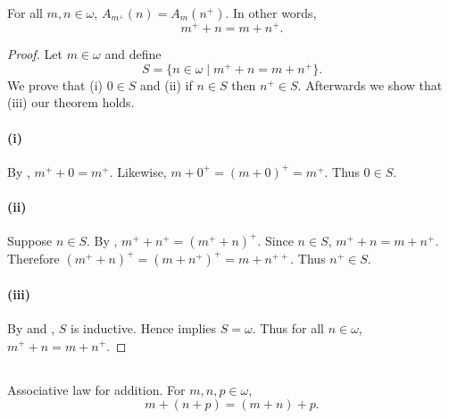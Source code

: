\documentclass{report}
\begin{document}
\begin{lemma}[3]

  For all $m, n \in \omega$, $A_{m^+}(n) = A_m(n^+)$.
  In other words, $$m^+ + n = m + n^+.$$

\end{lemma}

\begin{proof}


  Let $m \in \omega$ and define
    $$S = \{n \in \omega \mid m^+ + n = m + n^+\}.$$
  We prove that (i) $0 \in S$ and (ii) if $n \in S$ then $n^+ \in S$.
  Afterwards we show that (iii) our theorem holds.

  \paragraph{(i)}%

    By , $m^+ + 0 = m^+$.
    Likewise, $m + 0^+ = (m + 0)^+ = m^+$.
    Thus $0 \in S$.

  \paragraph{(ii)}%

    Suppose $n \in S$.
    By , $m^+ + n^+ = (m^+ + n)^+$.
    Since $n \in S$, $m^+ + n = m + n^+$.
    Therefore $(m^+ + n)^+ = (m + n^+)^+ = m + n^{++}$.
    Thus $n^+ \in S$.

  \paragraph{(iii)}%

    By  and , $S$ is inductive.
    Hence  implies $S = \omega$.
    Thus for all $n \in \omega$, $m^+ + n = m + n^+$.

\end{proof}

\subsection{}%
\label{sub:theorem-4k-1}

\begin{theorem}[4K-1]

  Associative law for addition.
  For $m, n, p \in \omega$, $$m + (n + p) = (m + n) + p.$$

\end{theorem}
\end{document}
